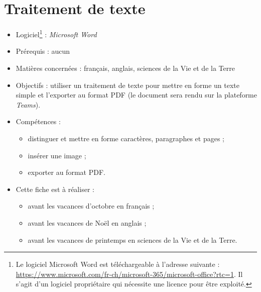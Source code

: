 \chapter{Traitement de texte}\label{ficheTexte1}  

\begin{itemize}
\item Logiciel\footnote{Le logiciel Microsoft Word est téléchargeable à l'adresse suivante : \url{https://www.microsoft.com/fr-ch/microsoft-365/microsoft-office?rtc=1}. Il s'agit d'un logiciel propriétaire qui nécessite une licence pour être exploité.} : \emph{Microsoft Word} 
\item Prérequis : aucun
\item Matières concernées : français, anglais, sciences de la Vie et de la Terre
\item Objectifs : utiliser un traitement de texte pour mettre en forme un texte simple et l'exporter au format PDF (le document sera rendu sur la plateforme \emph{Teams}).
\item Compétences : 
        \begin{itemize}
        \item distinguer et mettre en forme caractères, paragraphes et pages ;
        \item insérer une image ; 
        \item exporter au format PDF.
        \end{itemize}
\item Cette fiche est à réaliser :
        \begin{itemize}
        \item avant les vacances d'octobre en français ;
        \item avant les vacances de Noël en anglais ;
        \item avant les vacances de printemps en sciences de la Vie et de la Terre. 
        \end{itemize}
\end{itemize}


